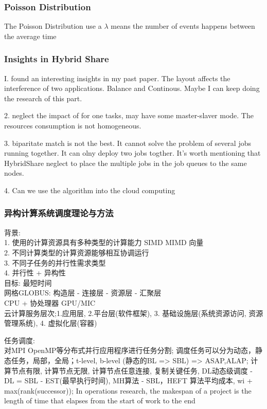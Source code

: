 \documentclass[UTF8]{article}
\begin{document}
\subsubsection{Poisson Distribution}
The Poisson Distribution use a $\lambda$ means the number of events happens between the average time 

\subsubsection{Insights in Hybrid Share}

I. found an interesting insights in my past paper. The layout affects the interference of two applications. Balance and Continous. Maybe I can keep doing the research of this part.

2. neglect the impact of for one tasks, may have some master-slaver mode. The resources consumption is not homogeneous.

3. biparitate match is not the best. It cannot solve the problem of several jobs running together. It can olny deploy two jobs togther. It's worth mentioning that HybridShare neglect to place the multiple jobs in the job queues to the same nodes.

4. Can we use the algorithm into the cloud computing

\subsubsection{异构计算系统调度理论与方法}
背景:\\
1. 使用的计算资源具有多种类型的计算能力 SIMD MIMD 向量 \\
2. 不同计算类型的计算资源能够相互协调运行 \\
3. 不同子任务的并行性需求类型 \\
4. 并行性 + 异构性 \\
目标: 最短时间\\
网格GLOBUS: 构造层 - 连接层 - 资源层 - 汇聚层\\
CPU + 协处理器 GPU/MIC \\
云计算服务层次;1.应用层, 2.平台层(软件框架), 3. 基础设施层(系统资源访问, 资源管理系统), 4. 虚拟化层(容器)

任务调度:\\对MPI OpenMP等分布式并行应用程序进行任务分割; 调度任务可以分为动态，静态任务，局部，全局；t-level, b-level (静态的BL => SBL)  => ASAP,ALAP; 计算节点有限, 计算节点无限, 计算节点任意连接, 复制关键任务, DL动态级调度 - DL = SBL - EST(最早执行时间), MH算法 - SBL，HEFT 算法平均成本, wi + max(rank(successor)); In operations research, the makespan of a project is the length of time that elapses from the start of work to the end
\end{document}
